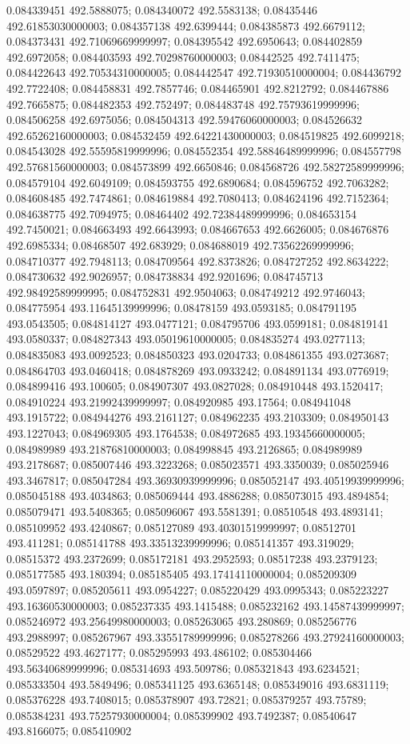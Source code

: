 0.084339451 492.5888075; 0.084340072 492.5583138; 0.08435446 492.61853030000003; 0.084357138 492.6399444; 0.084385873 492.6679112; 0.084373431 492.71069669999997; 0.084395542 492.6950643; 0.084402859 492.6972058; 0.084403593 492.70298760000003; 0.08442525 492.7411475; 0.084422643 492.70534310000005; 0.084442547 492.71930510000004; 0.084436792 492.7722408; 0.084458831 492.7857746; 0.084465901 492.8212792; 0.084467886 492.7665875; 0.084482353 492.752497; 0.084483748 492.75793619999996; 0.084506258 492.6975056; 0.084504313 492.59476060000003; 0.084526632 492.65262160000003; 0.084532459 492.64221430000003; 0.084519825 492.6099218; 0.084543028 492.55595819999996; 0.084552354 492.58846489999996; 0.084557798 492.57681560000003; 0.084573899 492.6650846; 0.084568726 492.58272589999996; 0.084579104 492.6049109; 0.084593755 492.6890684; 0.084596752 492.7063282; 0.084608485 492.7474861; 0.084619884 492.7080413; 0.084624196 492.7152364; 0.084638775 492.7094975; 0.08464402 492.72384489999996; 0.084653154 492.7450021; 0.084663493 492.6643993; 0.084667653 492.6626005; 0.084676876 492.6985334; 0.08468507 492.683929; 0.084688019 492.73562269999996; 0.084710377 492.7948113; 0.084709564 492.8373826; 0.084727252 492.8634222; 0.084730632 492.9026957; 0.084738834 492.9201696; 0.084745713 492.98492589999995; 0.084752831 492.9504063; 0.084749212 492.9746043; 0.084775954 493.11645139999996; 0.08478159 493.0593185; 0.084791195 493.0543505; 0.084814127 493.0477121; 0.084795706 493.0599181; 0.084819141 493.0580337; 0.084827343 493.05019610000005; 0.084835274 493.0277113; 0.084835083 493.0092523; 0.084850323 493.0204733; 0.084861355 493.0273687; 0.084864703 493.0460418; 0.084878269 493.0933242; 0.084891134 493.0776919; 0.084899416 493.100605; 0.084907307 493.0827028; 0.084910448 493.1520417; 0.084910224 493.21992439999997; 0.084920985 493.17564; 0.084941048 493.1915722; 0.084944276 493.2161127; 0.084962235 493.2103309; 0.084950143 493.1227043; 0.084969305 493.1764538; 0.084972685 493.19345660000005; 0.084989989 493.21876810000003; 0.084998845 493.2126865; 0.084989989 493.2178687; 0.085007446 493.3223268; 0.085023571 493.3350039; 0.085025946 493.3467817; 0.085047284 493.36930939999996; 0.085052147 493.40519939999996; 0.085045188 493.4034863; 0.085069444 493.4886288; 0.085073015 493.4894854; 0.085079471 493.5408365; 0.085096067 493.5581391; 0.08510548 493.4893141; 0.085109952 493.4240867; 0.085127089 493.40301519999997; 0.08512701 493.411281; 0.085141788 493.33513239999996; 0.085141357 493.319029; 0.08515372 493.2372699; 0.085172181 493.2952593; 0.08517238 493.2379123; 0.085177585 493.180394; 0.085185405 493.17414110000004; 0.085209309 493.0597897; 0.085205611 493.0954227; 0.085220429 493.0995343; 0.085223227 493.16360530000003; 0.085237335 493.1415488; 0.085232162 493.14587439999997; 0.085246972 493.25649980000003; 0.085263065 493.280869; 0.085256776 493.2988997; 0.085267967 493.33551789999996; 0.085278266 493.27924160000003; 0.08529522 493.4627177; 0.085295993 493.486102; 0.085304466 493.56340689999996; 0.085314693 493.509786; 0.085321843 493.6234521; 0.085333504 493.5849496; 0.085341125 493.6365148; 0.085349016 493.6831119; 0.085376228 493.7408015; 0.085378907 493.72821; 0.085379257 493.75789; 0.085384231 493.75257930000004; 0.085399902 493.7492387; 0.08540647 493.8166075; 0.085410902 